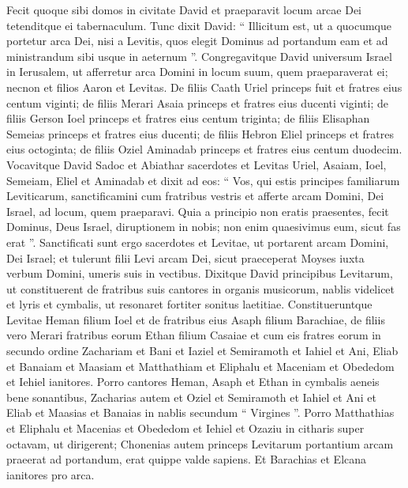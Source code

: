 \begin{biblechapter}
\begin{biblechapter}
\begin{biblechapter}
\begin{biblechapter}
\begin{biblechapter}
\begin{biblechapter}
\begin{biblechapter}
\begin{biblechapter}
\begin{biblechapter}
\begin{biblechapter}
\begin{biblechapter}
\begin{biblechapter}
\begin{biblechapter}
\begin{biblechapter}
\begin{biblechapter}
\verse Fecit quoque sibi domos in civitate David et praeparavit locum arcae Dei tetenditque ei tabernaculum. 
\verse Tunc dixit David: “ Illicitum est, ut a quocumque portetur arca Dei, nisi a Levitis, quos elegit Dominus ad portandum eam et ad ministrandum sibi usque in aeternum ”. 
\verse Congregavitque David universum Israel in Ierusalem, ut afferretur arca Domini in locum suum, quem praeparaverat ei; 
\verse necnon et filios Aaron et Levitas. 
\verse De filiis Caath Uriel princeps fuit et fratres eius centum viginti; 
\verse de filiis Merari Asaia princeps et fratres eius ducenti viginti; 
\verse de filiis Gerson Ioel princeps et fratres eius centum triginta; 
\verse de filiis Elisaphan Semeias princeps et fratres eius ducenti; 
\verse de filiis Hebron Eliel princeps et fratres eius octoginta; 
\verse de filiis Oziel Aminadab princeps et fratres eius centum duodecim.
 \verse Vocavitque David Sadoc et Abiathar sacerdotes et Levitas Uriel, Asaiam, Ioel, Semeiam, Eliel et Aminadab 
\verse et dixit ad eos: “ Vos, qui estis principes familiarum Leviticarum, sanctificamini cum fratribus vestris et afferte arcam Domini, Dei Israel, ad locum, quem praeparavi. 
\verse Quia a principio non eratis praesentes, fecit Dominus, Deus Israel, diruptionem in nobis; non enim quaesivimus eum, sicut fas erat ”. 
\verse Sanctificati sunt ergo sacerdotes et Levitae, ut portarent arcam Domini, Dei Israel; 
\verse et tulerunt filii Levi arcam Dei, sicut praeceperat Moyses iuxta verbum Domini, umeris suis in vectibus.
 \verse Dixitque David principibus Levitarum, ut constituerent de fratribus suis cantores in organis musicorum, nablis videlicet et lyris et cymbalis, ut resonaret fortiter sonitus laetitiae. 
\verse Constitueruntque Levitae Heman filium Ioel et de fratribus eius Asaph filium Barachiae, de filiis vero Merari fratribus eorum Ethan filium Casaiae 
\verse et cum eis fratres eorum in secundo ordine Zachariam et Bani et Iaziel et Semiramoth et Iahiel et Ani, Eliab et Banaiam et Maasiam et Matthathiam et Eliphalu et Maceniam et Obededom et Iehiel ianitores. 
\verse Porro cantores Heman, Asaph et Ethan in cymbalis aeneis bene sonantibus, 
\verse Zacharias autem et Oziel et Semiramoth et Iahiel et Ani et Eliab et Maasias et Banaias in nablis secundum “ Virgines ”. 
\verse Porro Matthathias et Eliphalu et Macenias et Obededom et Iehiel et Ozaziu in citharis super octavam, ut dirigerent; 
\verse Chonenias autem princeps Levitarum portantium arcam praeerat ad portandum, erat quippe valde sapiens. 
\verse Et Barachias et Elcana ianitores pro arca. 

\end{biblechapter}
\end{biblechapter}
\end{biblechapter}
\end{biblechapter}
\end{biblechapter}
\end{biblechapter}
\end{biblechapter}
\end{biblechapter}
\end{biblechapter}
\end{biblechapter}
\end{biblechapter}
\end{biblechapter}
\end{biblechapter}
\end{biblechapter}
\end{biblechapter}

